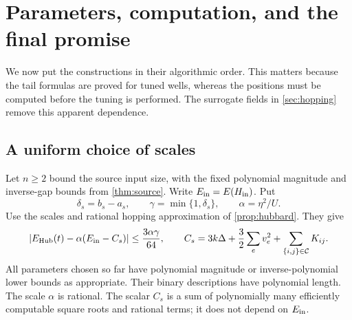 \section{Parameters, computation, and the final promise}\label{sec:completion}

We now put the constructions in their algorithmic order. This matters because the tail formulas are proved for tuned wells, whereas the positions must be computed before the tuning is performed. The surrogate fields in \cref{sec:hopping} remove this apparent dependence.

\subsection{A uniform choice of scales}

Let $n\ge2$ bound the source input size, with the fixed polynomial magnitude and inverse-gap bounds from \cref{thm:source}. Write $E_{\rm in}=E(H_{\rm in})$. Put
\[
\delta_s=b_s-a_s,\qquad \gamma=\min\{1,\delta_s\},
\qquad \alpha=\eta^2/U.
\]
Use the scales and rational hopping approximation of \cref{prop:hubbard}. They give
\begin{equation}\label{eq:finite-final-error}
\left|E_{\rm Hub}(t)-\alpha(E_{\rm in}-C_s)\right|
\le \frac{3\alpha\gamma}{64},
\qquad
C_s=3k\Delta+\frac32\sum_e v_e^2+
                      \sum_{\{i,j\}\in\mathcal C}K_{ij}.
\end{equation}
All parameters chosen so far have polynomial magnitude or inverse-polynomial lower bounds as appropriate. Their binary descriptions have polynomial length. The scale $\alpha$ is rational. The scalar $C_s$ is a sum of polynomially many efficiently computable square roots and rational terms; it does not depend on $E_{\rm in}$.

